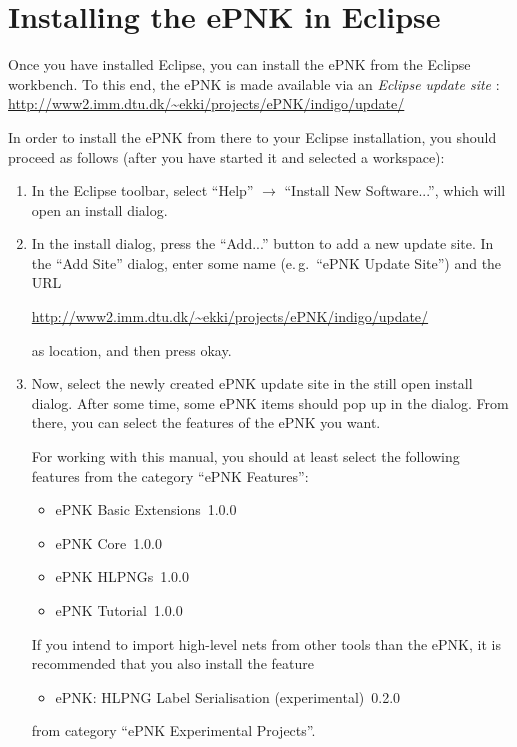 \section{Installing the ePNK in Eclipse}
Once you have installed Eclipse, you can install the ePNK from
the Eclipse workbench. To this end, the ePNK is made available
via an \emph{Eclipse update site}%
: \url{http://www2.imm.dtu.dk/~ekki/projects/ePNK/indigo/update/}


In order to install the ePNK from there to your Eclipse installation, you should
proceed as follows (after you have started it and selected a workspace):
\begin{enumerate}
\item In the Eclipse toolbar, select 
      ``Help'' $\rightarrow$ ``Install New Software...'', which will open
      an install dialog.

\item  In the install dialog, press the ``Add...'' button to add
       a new update site. In the ``Add Site'' dialog, enter some name 
       (e.\,g.\ ``ePNK Update Site'') and the URL
       
       \url{http://www2.imm.dtu.dk/~ekki/projects/ePNK/indigo/update/}
       
       as location, and then press okay.
       
\item Now, select the newly created ePNK update site in the still open
      install dialog. After some time, some ePNK items should pop up in the
      dialog. From there, you can select the features of the ePNK
      you want.
      
      For working with this manual, you should at least select the following
      features from the category ``ePNK Features'':
      \begin{itemize}
      \item ePNK Basic Extensions~1.0.0
      \item ePNK Core~1.0.0
      \item ePNK HLPNGs~1.0.0
      \item ePNK Tutorial~1.0.0 
      \end{itemize}
      
      If you intend to import high-level nets from other tools than the
      ePNK, it is recommended that you also install the feature 
      \begin{itemize}
      \item ePNK: HLPNG Label Serialisation (experimental)~0.2.0 
      \end{itemize}
      from category ``ePNK Experimental Projects''.
      

\end{enumerate}
